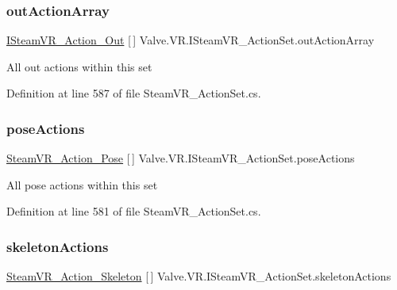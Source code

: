 \subsubsection{\texorpdfstring{outActionArray}{outActionArray}}
{\footnotesize\ttfamily \mbox{\hyperlink{interface_valve_1_1_v_r_1_1_i_steam_v_r___action___out}{I\+Steam\+V\+R\+\_\+\+Action\+\_\+\+Out}} \mbox{[}$\,$\mbox{]} Valve.\+V\+R.\+I\+Steam\+V\+R\+\_\+\+Action\+Set.\+out\+Action\+Array\hspace{0.3cm}{\ttfamily [get]}}



All out actions within this set 



Definition at line 587 of file Steam\+V\+R\+\_\+\+Action\+Set.\+cs.

\mbox{\label{interface_valve_1_1_v_r_1_1_i_steam_v_r___action_set_afe532a646e044a3594d5e23485612077}} 
\subsubsection{\texorpdfstring{poseActions}{poseActions}}
{\footnotesize\ttfamily \mbox{\hyperlink{class_valve_1_1_v_r_1_1_steam_v_r___action___pose}{Steam\+V\+R\+\_\+\+Action\+\_\+\+Pose}} \mbox{[}$\,$\mbox{]} Valve.\+V\+R.\+I\+Steam\+V\+R\+\_\+\+Action\+Set.\+pose\+Actions\hspace{0.3cm}{\ttfamily [get]}}



All pose actions within this set 



Definition at line 581 of file Steam\+V\+R\+\_\+\+Action\+Set.\+cs.

\mbox{\label{interface_valve_1_1_v_r_1_1_i_steam_v_r___action_set_a210d3ca82c352f4fe3a118bdd7b9bf41}} 
\subsubsection{\texorpdfstring{skeletonActions}{skeletonActions}}
{\footnotesize\ttfamily \mbox{\hyperlink{class_valve_1_1_v_r_1_1_steam_v_r___action___skeleton}{Steam\+V\+R\+\_\+\+Action\+\_\+\+Skeleton}} \mbox{[}$\,$\mbox{]} Valve.\+V\+R.\+I\+Steam\+V\+R\+\_\+\+Action\+Set.\+skeleton\+Actions\hspace{0.3cm}{\ttfamily [get]}}



